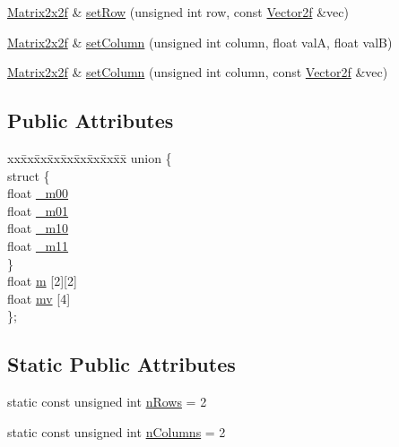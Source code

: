 \begin{DoxyCompactItemize}
\item 
\hyperlink{classh2_1_1_matrix2x2f}{Matrix2x2f} \& \hyperlink{classh2_1_1_matrix2x2f_ab684cd44b0684a95543df41afc160273}{set\-Row} (unsigned int row, const \hyperlink{classh2_1_1_vector2f}{Vector2f} \&vec)
\item 
\hyperlink{classh2_1_1_matrix2x2f}{Matrix2x2f} \& \hyperlink{classh2_1_1_matrix2x2f_adede40ba1285080d4d7546b39b9617a6}{set\-Column} (unsigned int column, float val\-A, float val\-B)
\item 
\hyperlink{classh2_1_1_matrix2x2f}{Matrix2x2f} \& \hyperlink{classh2_1_1_matrix2x2f_a80b9fdba4c4bf7317357cb28c937ab34}{set\-Column} (unsigned int column, const \hyperlink{classh2_1_1_vector2f}{Vector2f} \&vec)
\end{DoxyCompactItemize}
\subsection*{Public Attributes}
\begin{DoxyCompactItemize}
\item 
\begin{tabbing}
xx\=xx\=xx\=xx\=xx\=xx\=xx\=xx\=xx\=\kill
union \{\\
\>struct \{\\
\>\>float \hyperlink{classh2_1_1_matrix2x2f_a9e1275895d14f8bd6bc8feeeeeaa7929}{\_m00}\\
\>\>float \hyperlink{classh2_1_1_matrix2x2f_a7d73c1fae5e8461bb82e5242fbdd5c1e}{\_m01}\\
\>\>float \hyperlink{classh2_1_1_matrix2x2f_adceb38a04bd7cf0a8ab950c51e60c379}{\_m10}\\
\>\>float \hyperlink{classh2_1_1_matrix2x2f_a9174df3b53a0bd9387c5d2310ac10162}{\_m11}\\
\>\} \\
\>float \hyperlink{classh2_1_1_matrix2x2f_acb3cfb4eb97068e8b5f810cd49838e87}{m} \mbox{[}2\mbox{]}\mbox{[}2\mbox{]}\\
\>float \hyperlink{classh2_1_1_matrix2x2f_abcbe12870c7e883f72d7cbd8afc38572}{mv} \mbox{[}4\mbox{]}\\
\}; \\

\end{tabbing}\end{DoxyCompactItemize}
\subsection*{Static Public Attributes}
\begin{DoxyCompactItemize}
\item 
static const unsigned int \hyperlink{classh2_1_1_matrix2x2f_a5ab9bea382b523eb7568c77132de01ed}{n\-Rows} = 2
\item 
static const unsigned int \hyperlink{classh2_1_1_matrix2x2f_a076bbf7661df8f6cf0b073c5b44bcc4c}{n\-Columns} = 2
\end{DoxyCompactItemize}
